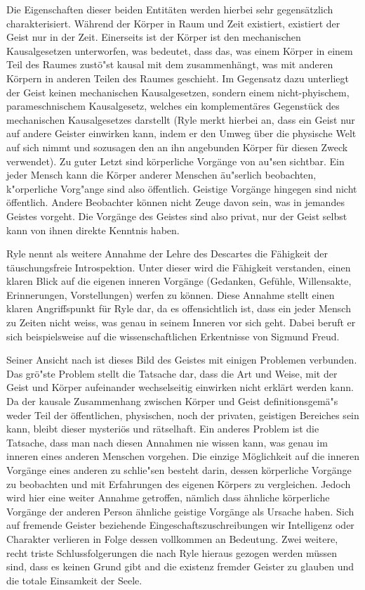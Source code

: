 \documentclass[a4paper]{article}
\begin{document}
Die Eigenschaften dieser beiden \glqq Entitäten\grqq{} werden hierbei sehr gegensätzlich charakterisiert. Während der Körper in Raum und Zeit existiert, existiert der Geist nur in der Zeit. Einerseits ist der Körper ist den mechanischen Kausalgesetzen unterworfen, was bedeutet, dass das, was einem Körper in einem Teil des Raumes zustö"st kausal mit dem zusammenhängt, was mit anderen Körpern in anderen Teilen des Raumes geschieht. Im Gegensatz dazu unterliegt der Geist keinen mechanischen Kausalgesetzen, sondern einem nicht-phyischem, parameschnischem Kausalgesetz, welches ein komplementäres Gegenstück des mechanischen Kausalgesetzes darstellt (Ryle merkt hierbei an, dass ein Geist nur auf andere Geister einwirken kann, indem er den \glqq Umweg\grqq{} über die physische Welt auf sich nimmt und sozusagen den an ihn angebunden Körper für diesen Zweck verwendet). Zu guter Letzt sind körperliche Vorgänge von au"sen sichtbar. Ein jeder Mensch kann die Körper anderer Menschen äu"serlich beobachten, k"orperliche Vorg"ange sind also öffentlich. Geistige Vorgänge hingegen sind nicht öffentlich. Andere Beobachter können nicht Zeuge davon sein, was in jemandes Geistes vorgeht. Die Vorgänge des Geistes sind also privat, nur der Geist selbst kann von ihnen direkte Kenntnis haben.

Ryle nennt als weitere Annahme der Lehre des Descartes die Fähigkeit der täuschungsfreie Introspektion. Unter dieser wird die Fähigkeit verstanden, einen klaren Blick auf die eigenen inneren Vorgänge (Gedanken, Gefühle, Willensakte, Erinnerungen, Vorstellungen) werfen zu können. Diese Annahme stellt einen klaren Angriffspunkt für Ryle dar, da es offensichtlich ist, dass ein jeder Mensch zu Zeiten nicht weiss, was genau in seinem Inneren vor sich geht. Dabei beruft er sich beispielsweise auf die wissenschaftlichen Erkentnisse von Sigmund Freud.

Seiner Ansicht nach ist dieses Bild des Geistes mit einigen Problemen verbunden. Das grö"ste Problem stellt die Tatsache dar, dass die Art und Weise, mit der Geist und Körper aufeinander wechselseitig einwirken nicht erklärt werden kann. Da der kausale Zusammenhang zwischen Körper und Geist definitionsgemä"s weder Teil der öffentlichen, physischen, noch der privaten, geistigen Bereiches sein kann, bleibt dieser mysteriös und rätselhaft. Ein anderes Problem ist die Tatsache, dass man nach diesen Annahmen nie wissen kann, was genau im inneren eines anderen Menschen vorgehen. Die einzige Möglichkeit auf die inneren Vorgänge eines anderen zu schlie"sen besteht darin, dessen körperliche Vorgänge zu beobachten und mit Erfahrungen des eigenen Körpers zu vergleichen. Jedoch wird hier eine weiter Annahme getroffen, nämlich dass ähnliche körperliche Vorgänge der anderen Person ähnliche geistige Vorgänge als Ursache haben. Sich auf fremende Geister beziehende Eingeschaftszuschreibungen wir Intelligenz oder Charakter verlieren in Folge dessen vollkommen an Bedeutung. Zwei weitere, recht triste Schlussfolgerungen die nach Ryle hieraus gezogen werden müssen sind, dass es keinen Grund gibt and die existenz fremder Geister zu glauben und die totale Einsamkeit der Seele.
\end{document}
